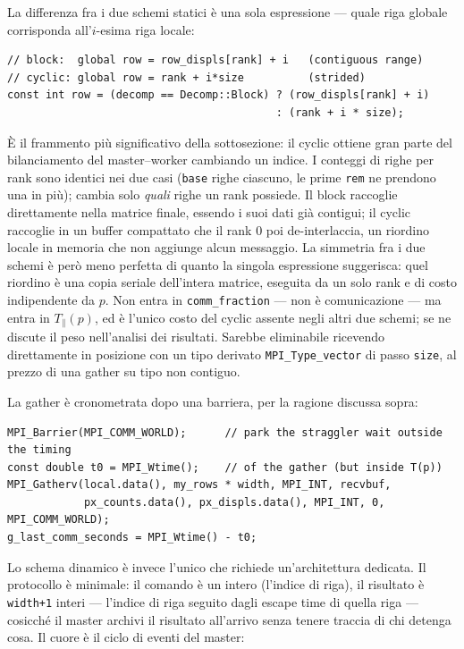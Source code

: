 La differenza fra i due schemi statici è una sola espressione --- quale riga
globale corrisponda all'$i$-esima riga locale:

\begin{verbatim}
// block:  global row = row_displs[rank] + i   (contiguous range)
// cyclic: global row = rank + i*size          (strided)
const int row = (decomp == Decomp::Block) ? (row_displs[rank] + i)
                                          : (rank + i * size);
\end{verbatim}

È il frammento più significativo della sottosezione: il cyclic ottiene gran
parte del bilanciamento del master--worker cambiando un indice. I conteggi di
righe per rank sono identici nei due casi (\texttt{base} righe ciascuno, le
prime \texttt{rem} ne prendono una in più); cambia solo \emph{quali} righe un
rank possiede. Il block raccoglie direttamente nella matrice finale, essendo i
suoi dati già contigui; il cyclic raccoglie in un buffer compattato che il rank
$0$ poi de-interlaccia, un riordino locale in memoria che non aggiunge alcun
messaggio. La simmetria fra i due schemi è però meno perfetta di quanto la
singola espressione suggerisca: quel riordino è una copia seriale dell'intera
matrice, eseguita da un solo rank e di costo indipendente da $p$. Non entra in
\texttt{comm\_fraction} --- non è comunicazione --- ma entra in $T_\parallel(p)$,
ed è l'unico costo del cyclic assente negli altri due schemi; se ne discute
il peso nell'analisi dei risultati. Sarebbe eliminabile ricevendo direttamente
in posizione con un tipo derivato \texttt{MPI\_Type\_vector} di passo
\texttt{size}, al prezzo di una gather su tipo non contiguo.

La gather è cronometrata dopo una barriera, per la ragione discussa sopra:

\begin{verbatim}
MPI_Barrier(MPI_COMM_WORLD);      // park the straggler wait outside the timing
const double t0 = MPI_Wtime();    // of the gather (but inside T(p))
MPI_Gatherv(local.data(), my_rows * width, MPI_INT, recvbuf,
            px_counts.data(), px_displs.data(), MPI_INT, 0, MPI_COMM_WORLD);
g_last_comm_seconds = MPI_Wtime() - t0;
\end{verbatim}

Lo schema dinamico è invece l'unico che richiede un'architettura dedicata. Il
protocollo è minimale: il comando è un intero (l'indice di riga), il risultato è
\texttt{width+1} interi --- l'indice di riga seguito dagli escape time di quella
riga --- cosicché il master archivi il risultato all'arrivo senza tenere traccia
di chi detenga cosa. Il cuore è il ciclo di eventi del master:

